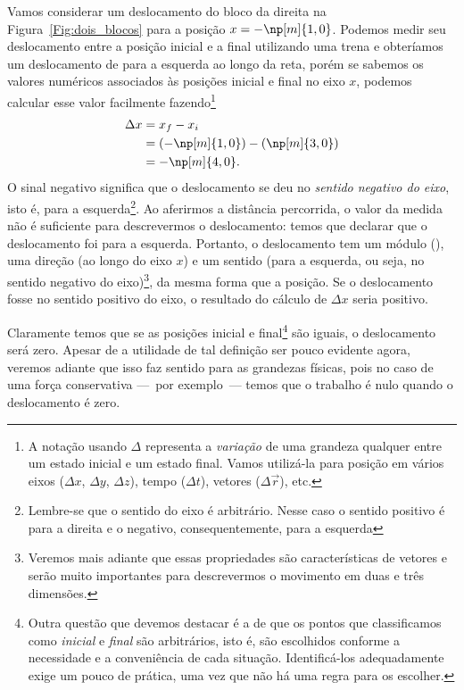 Vamos considerar um deslocamento do bloco da direita na Figura~\ref{Fig:dois_blocos} para a posição $x = -\np[m]{1,0}$. Podemos medir seu deslocamento entre a posição inicial e a final utilizando uma trena e obteríamos um deslocamento de  para a esquerda ao longo da reta, porém se sabemos os valores numéricos associados às posições inicial e final no eixo $x$, podemos calcular esse valor facilmente fazendo\footnote{A notação usando $\Delta$ representa a \emph{variação} de uma grandeza qualquer entre um estado inicial e um estado final. Vamos utilizá-la para posição em vários eixos ($\Delta x$, $\Delta y$, $\Delta z$), tempo ($\Delta t$), vetores ($\Delta\vec{r}$), etc.}
\begin{align}
  \Delta x &= x_f - x_i \\
  &= (-\np[m]{1,0}) - (\np[m]{3,0}) \\
  &= -\np[m]{4,0}.
\end{align}
%
O sinal negativo significa que o deslocamento se deu no \emph{sentido negativo do eixo}, isto é, para a esquerda\footnote{Lembre-se que o sentido do eixo é arbitrário. Nesse caso o sentido positivo é para a direita e o negativo, consequentemente, para a esquerda}. Ao aferirmos a distância percorrida, o valor da medida não é suficiente para descrevermos o deslocamento: temos que declarar que o deslocamento foi para a esquerda. Portanto, o deslocamento tem um módulo (), uma direção (ao longo do eixo $x$) e um sentido (para a esquerda, ou seja, no sentido negativo do eixo)\footnote{Veremos mais adiante que essas propriedades são características de vetores e serão muito importantes para descrevermos o movimento em duas e três dimensões.}, da mesma forma que a posição. Se o deslocamento fosse no sentido positivo do eixo, o resultado do cálculo de $\Delta x$ seria positivo. 

Claramente temos que se as posições inicial e final\footnote{Outra questão que devemos destacar é a de que os pontos que classificamos como \emph{inicial} e \emph{final} são arbitrários, isto é, são escolhidos conforme a necessidade e a conveniência de cada situação. Identificá-los adequadamente exige um pouco de prática, uma vez que não há uma regra para os escolher.} são iguais, o deslocamento será zero. Apesar de a utilidade de tal definição ser pouco evidente agora, veremos adiante que isso faz sentido para as grandezas físicas, pois no caso de uma força conservativa ---~por exemplo~--- temos que o trabalho é nulo quando o deslocamento é zero.

